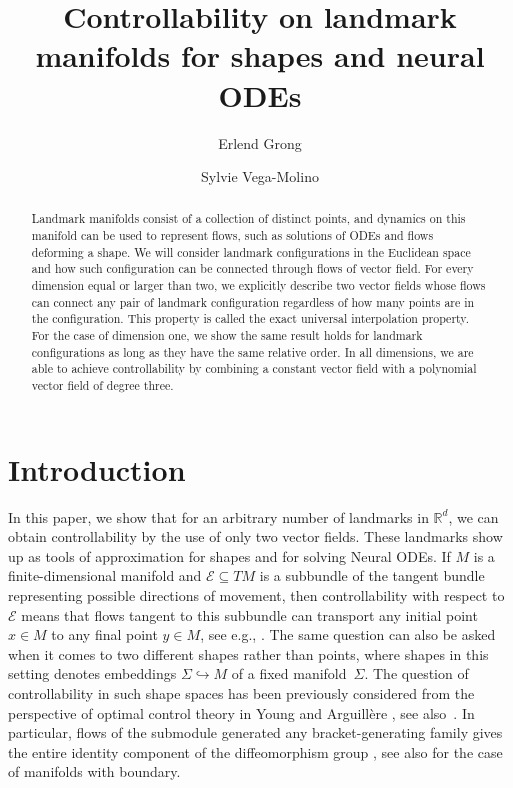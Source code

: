 \documentclass[10pt]{amsart}
\title[Controllability on landmark manifolds]{Controllability on landmark manifolds for shapes and neural ODEs}
\author[E.~Grong]{Erlend Grong}
\author[S.~Vega-Molino]{Sylvie Vega-Molino}
\theoremstyle{remark}
\newcommand{\E}{\mathcal{E}}
\numberwithin{equation}{section}
\begin{document}

\begin{abstract}
Landmark manifolds consist of a collection of distinct points, and dynamics on this manifold can be used to represent flows, such as solutions of ODEs and flows deforming a shape. We will consider landmark configurations in the Euclidean space and how such configuration can be connected through flows of vector field. For every dimension equal or larger than two, we explicitly describe two vector fields whose flows can connect any pair of landmark configuration regardless of how many points are in the configuration. This property is called the exact universal interpolation property. For the case of dimension one, we show the same result holds for landmark configurations as long as they have the same relative order. In all dimensions, we are able to achieve controllability by combining a constant vector field with a polynomial vector field of degree three.
\end{abstract}

\maketitle


\section{Introduction}

In this paper, we show that for an arbitrary number of landmarks in $\mathbb{R}^d$, we can obtain controllability by the use of only two vector fields. These landmarks show up as tools of approximation for shapes and for solving Neural ODEs. If $M$ is a finite-dimensional manifold and $\E \subseteq TM$ is a subbundle of the tangent bundle representing possible directions of movement, then controllability with respect to $\E$ means that flows tangent to this subbundle can transport any initial point $x \in M$ to any final point $y \in M$, see e.g., \cite{Sussmann-1990,AS04, BoscainSigalotti-2019}. The same question can also be asked when it comes to two different shapes rather than points, where shapes in this setting denotes embeddings $\Sigma \hookrightarrow M$ of a fixed manifold~$\Sigma$. The question of controllability in such shape spaces has been previously considered from the perspective of optimal control theory in  Young \cite{Younes-2012} and Arguillère \cite{Arguillre-2014a, Arguillre-2014b, Arguillre-2015}, see also~\cite{Gris-2018}.  In particular, flows of the submodule generated any bracket-generating family gives the entire identity component of the diffeomorphism group \cite{Agrachev-2009}, see also \cite{GrSch25,GGS24} for the case of manifolds with boundary.
\end{document}
